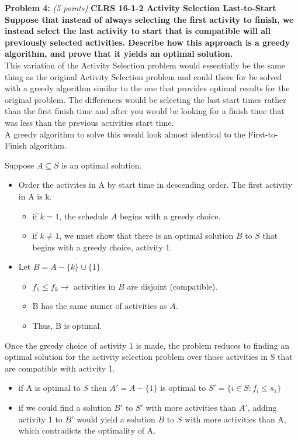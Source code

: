 \documentclass{article}
\begin{document}
\noindent \textbf{Problem 4:} \textit{(5 points)} \textbf{CLRS 16-1-2 Activity Selection Last-to-Start}\\

\noindent\textbf{Suppose that instead of always selecting the first activity to finish, we instead select the last activity to start that is compatible will all previously selected activities. Describe how this approach is a greedy algorithm, and prove that it yields an optimal solution.}
\\[.25cm]

This variation of the Activity Selection problem would essentially be the same thing as the original Activity Selection problem and could there for be solved with a greedy algorithm similar to the one that provides optimal results for the original problem. The differences would be selecting the last start times rather than the first finish time and after you would be looking for a finish time that was less than the previous activities start time.\\
A greedy algorithm to solve this would look almost identical to the First-to-Finish algorithm. 

\noindent Suppose $A \subseteq S$ is an optimal solution.
\begin{itemize} 
	\item Order the activites in A by start time in descending order. The first activity in A is k.
	\begin{itemize}	
		\item if $k = 1$, the schedule $A$ begins with a greedy choice.
		\item if $k \neq 1$, we must show that there is an optimal solution $B$ to $S$ that begins with a greedy choice, activity 1.
	\end{itemize}
	\item Let $B = A - \{k\} \cup \{1\}$
	\begin{itemize}	
		\item $f_1 \leq f_k \rightarrow$ activities in $B$ are disjoint (compatible).
		\item B has the same numer of activities as $A$.
		\item Thus, B is optimal.
	\end{itemize}	
\end{itemize}

Once the greedy choice of activity 1 is made, the problem reduces to finding an optimal solution for the activity selection problem over those activities in S that are compatible with activity 1. 
\begin{itemize}	
	\item if A is optimal to $S$ then $A' = A - \{1\}$ is optimal to $S' = \{i \in S: f_i \leq s_1\}$
	\item if we could find a solution $B'$ to $S'$ with more activities than $A'$, adding activity 1 to $B'$ would yield a solution $B$ to $S$ with more activities than A, which contradicts the optimality of A. 
\end{itemize}
\end{document}
